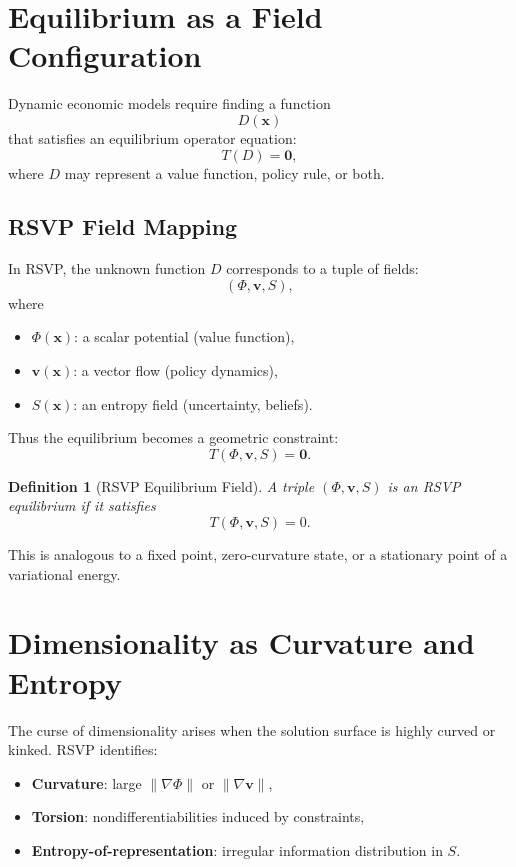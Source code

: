 \documentclass[12pt]{article}
\newtheorem{definition}{Definition}
\begin{document}
\section{Equilibrium as a Field Configuration}

Dynamic economic models require finding a function
\begin{equation}
    D(\mathbf{x})
\end{equation}
that satisfies an equilibrium operator equation:
\begin{equation}
    T(D) = \mathbf{0},
\end{equation}
where $D$ may represent a value function, policy rule, or both.

\subsection*{RSVP Field Mapping}

In RSVP, the unknown function $D$ corresponds to a tuple of fields:
\[
(\Phi, \mathbf{v}, S),
\]
where
\begin{itemize}
    \item $\Phi(\mathbf{x})$: a scalar potential (value function),
    \item $\mathbf{v}(\mathbf{x})$: a vector flow (policy dynamics),
    \item $S(\mathbf{x})$: an entropy field (uncertainty, beliefs).
\end{itemize}

Thus the equilibrium becomes a geometric constraint:
\begin{equation}
    T(\Phi, \mathbf{v}, S) = \mathbf{0}.
\end{equation}

\begin{definition}[RSVP Equilibrium Field]
A triple $(\Phi, \mathbf{v}, S)$ is an RSVP equilibrium if it satisfies
\[
T(\Phi,\mathbf{v},S)=0.
\]
\end{definition}

\noindent
This is analogous to a fixed point, zero-curvature state, or a stationary point of a variational energy.

\section{Dimensionality as Curvature and Entropy}

The curse of dimensionality arises when the solution surface is highly 
curved or kinked. RSVP identifies:
\begin{itemize}
    \item \textbf{Curvature}: large $\|\nabla \Phi\|$ or $\|\nabla \mathbf{v}\|$,
    \item \textbf{Torsion}: nondifferentiabilities induced by constraints,
    \item \textbf{Entropy-of-representation}: irregular information 
    distribution in $S$.
\end{itemize}
\end{document}

